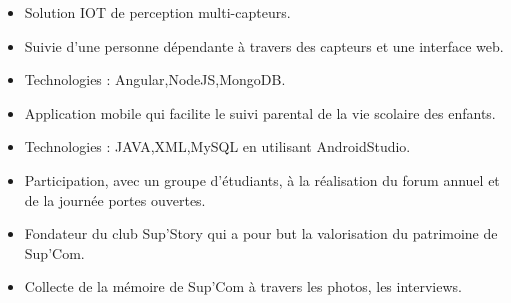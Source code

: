 \documentclass[9pt,a4paper,ragged2e,normalphoto]{altacv}
\begin{document}
\divider

\begin{itemize}
\item Solution IOT de perception multi-capteurs.
\item Suivie d'une personne dépendante à travers des capteurs et une interface web.    
\item Technologies : Angular,NodeJS,MongoDB.
\end{itemize}

\divider

\begin{itemize}
\item Application mobile qui facilite le suivi parental de la vie scolaire des enfants.    
\item Technologies : JAVA,XML,MySQL en utilisant AndroidStudio.
\end{itemize}




{}

{}


\begin{itemize}
\item Participation, avec un groupe d’étudiants, à la réalisation du forum
annuel et de la journée portes ouvertes.
\end{itemize}

\divider

\begin{itemize}
\item Fondateur du club Sup'Story qui a pour but la valorisation du patrimoine de Sup'Com.
\item Collecte de la mémoire de Sup'Com à travers les photos, les interviews.
\end{itemize}


\clearpage
\end{document}
